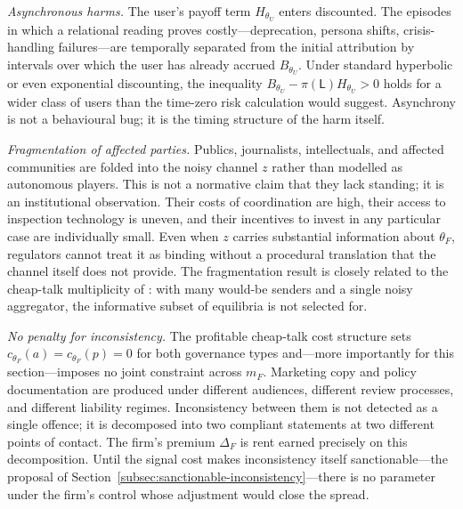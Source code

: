 \documentclass[preprint,authoryear]{elsarticle}
\theoremstyle{definition}
\theoremstyle{plain}
\begin{document}
\emph{Asynchronous harms.} The user's payoff term $H_{\theta_U}$ enters discounted. The episodes in which a relational reading proves costly---deprecation, persona shifts, crisis-handling failures---are temporally separated from the initial attribution by intervals over which the user has already accrued $B_{\theta_U}$. Under standard hyperbolic or even exponential discounting, the inequality $B_{\theta_U}-\pi(\mathsf{L})H_{\theta_U}>0$ holds for a wider class of users than the time-zero risk calculation would suggest. Asynchrony is not a behavioural bug; it is the timing structure of the harm itself.

\emph{Fragmentation of affected parties.} Publics, journalists, intellectuals, and affected communities are folded into the noisy channel $z$ rather than modelled as autonomous players. This is not a normative claim that they lack standing; it is an institutional observation. Their costs of coordination are high, their access to inspection technology is uneven, and their incentives to invest in any particular case are individually small. Even when $z$ carries substantial information about $\theta_F$, regulators cannot treat it as binding without a procedural translation that the channel itself does not provide. The fragmentation result is closely related to the cheap-talk multiplicity of \citet{crawford_sobel1982}: with many would-be senders and a single noisy aggregator, the informative subset of equilibria is not selected for.

\emph{No penalty for inconsistency.} The profitable cheap-talk cost structure sets $c_{\theta_F}(a)=c_{\theta_F}(p)=0$ for both governance types and---more importantly for this section---imposes no joint constraint across $m_F$. Marketing copy and policy documentation are produced under different audiences, different review processes, and different liability regimes. Inconsistency between them is not detected as a single offence; it is decomposed into two compliant statements at two different points of contact. The firm's premium $\Delta_F$ is rent earned precisely on this decomposition. Until the signal cost makes inconsistency itself sanctionable---the proposal of Section~\ref{subsec:sanctionable-inconsistency}---there is no parameter under the firm's control whose adjustment would close the spread.
\end{document}
